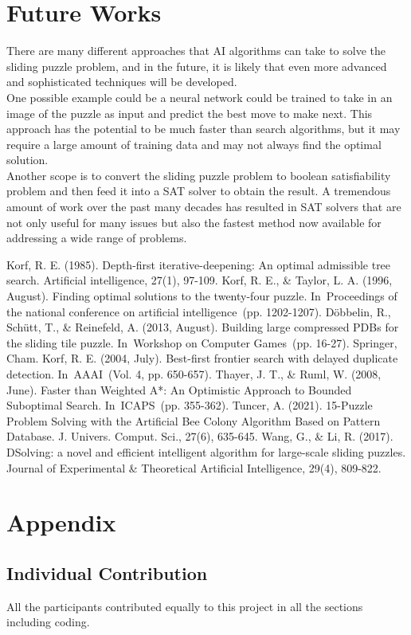 \documentclass[12pt]{article}
\begin{document}
\section{Future Works}
There are many different approaches that AI algorithms can take to solve the sliding puzzle problem, and in the future, it is likely that even more advanced and sophisticated techniques will be developed. \\
One possible example could be a neural network could be trained to take in an image of the puzzle as input and predict the best move to make next. This approach has the potential to be much faster than search algorithms, but it may require a large amount of training data and may not always find the optimal solution. \\
Another scope is to convert the sliding puzzle problem to boolean satisfiability problem and then feed it into a SAT solver to obtain the result. A tremendous amount of work over the past many decades has resulted in SAT solvers that are not only useful for many issues but also the fastest method now available for addressing a wide range of problems.

\begin{thebibliography}{00}
 Korf, R. E. (1985). Depth-first iterative-deepening: An optimal admissible tree search. Artificial intelligence, 27(1), 97-109.
 Korf, R. E., \& Taylor, L. A. (1996, August). Finding optimal solutions to the twenty-four puzzle. In Proceedings of the national conference on artificial intelligence (pp. 1202-1207). 
 Döbbelin, R., Schütt, T., \& Reinefeld, A. (2013, August). Building large compressed PDBs for the sliding tile puzzle. In Workshop on Computer Games (pp. 16-27). Springer, Cham. 
 Korf, R. E. (2004, July). Best-first frontier search with delayed duplicate detection. In AAAI (Vol. 4, pp. 650-657). 
 Thayer, J. T., \& Ruml, W. (2008, June). Faster than Weighted A*: An Optimistic Approach to Bounded Suboptimal Search. In ICAPS (pp. 355-362). 
 Tuncer, A. (2021). 15-Puzzle Problem Solving with the Artificial Bee Colony Algorithm Based on Pattern Database. J. Univers. Comput. Sci., 27(6), 635-645.
 Wang, G., \& Li, R. (2017). DSolving: a novel and efficient intelligent algorithm for large-scale sliding puzzles. Journal of Experimental \& Theoretical Artificial Intelligence, 29(4), 809-822.
\end{thebibliography}

\section*{Appendix}

\subsection*{Individual Contribution}
All the participants contributed equally to this project in all the sections including coding.
\end{document}
